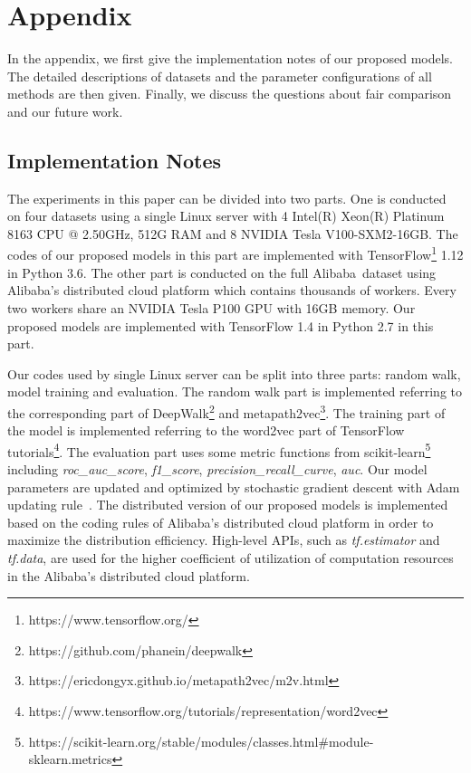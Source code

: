 \documentclass[sigconf]{acmart}
\newcommand{\company}{Alibaba}
\begin{document}
\appendix
\section{Appendix}
\label{sec:reproduce}


In the appendix, we first give the implementation notes of our proposed models. The detailed descriptions of datasets and the parameter configurations of all methods are then given. Finally, we discuss the questions about fair comparison and our future work. 

\subsection{Implementation Notes}

The experiments in this paper can be divided into two parts. One is conducted on four datasets using a single Linux server with 4 Intel(R) Xeon(R) Platinum 8163 CPU @ 2.50GHz, 512G RAM and 8 NVIDIA Tesla V100-SXM2-16GB. The codes of our proposed models in this part are implemented with TensorFlow\footnote{\label{fn:tf}https://www.tensorflow.org/} 1.12 in Python 3.6. The other part is conducted on the full \company\ dataset using \company's distributed cloud platform which contains thousands of workers. Every two workers share an NVIDIA Tesla P100 GPU with 16GB memory. Our proposed models are implemented with TensorFlow 1.4 in Python 2.7 in this part.

Our codes used by single Linux server can be split into three parts: random walk, model training and evaluation. The random walk part is implemented referring to the corresponding part of DeepWalk\footnote{\label{fn:deepwalk}https://github.com/phanein/deepwalk} and metapath2vec\footnote{\label{fn:mp2vec}https://ericdongyx.github.io/metapath2vec/m2v.html}. The training part of the model is implemented referring to the word2vec part of TensorFlow tutorials\footnote{https://www.tensorflow.org/tutorials/representation/word2vec}. The evaluation part uses some metric functions from scikit-learn\footnote{https://scikit-learn.org/stable/modules/classes.html\#module-sklearn.metrics} including \textit{roc\_auc\_score}, \textit{f1\_score}, \textit{precision\_recall\_curve}, \textit{auc}. Our model parameters are updated and optimized by stochastic gradient descent with Adam updating rule~\cite{kingma2014adam}. The distributed version of our proposed models is implemented based on the coding rules of \company's distributed cloud platform in order to maximize the distribution efficiency. High-level APIs, such as \textit{tf.estimator} and \textit{tf.data}, are used for the higher coefficient of utilization of computation resources in the \company's distributed cloud platform.  
\end{document}
